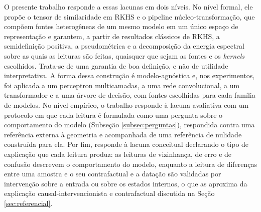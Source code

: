 O presente trabalho responde a essas lacunas em dois níveis. No nível formal, ele propõe o tensor de similaridade em RKHS e o pipeline núcleo-transformação, que compõem fontes heterogêneas de um mesmo modelo em um único espaço de representação e garantem, a partir de resultados clássicos de RKHS, a semidefinição positiva, a pseudométrica e a decomposição da energia espectral sobre as quais as leituras são feitas, quaisquer que sejam as fontes e os \textit{kernels} escolhidos. Trata-se de uma garantia de boa definição, e não de utilidade interpretativa. A forma dessa construção é modelo-agnóstica e, nos experimentos, foi aplicada a um perceptron multicamadas, a uma rede convolucional, a um transformador e a uma árvore de decisão, com fontes escolhidas para cada família de modelos. No nível empírico, o trabalho responde à lacuna avaliativa com um protocolo em que cada leitura é formulada como uma pergunta sobre o comportamento do modelo (Subseção \ref{subsec:perguntas}), respondida contra uma referência externa à geometria e acompanhada de uma referência de nulidade construída para ela. Por fim, responde à lacuna conceitual declarando o tipo de explicação que cada leitura produz: as leituras de vizinhança, de erro e de confusão descrevem o comportamento do modelo, enquanto a leitura de diferenças entre uma amostra e o seu contrafactual e a datação são validadas por intervenção sobre a entrada ou sobre os estados internos, o que as aproxima da explicação causal-intervencionista e contrafactual discutida na Seção \ref{sec:referencial}.
